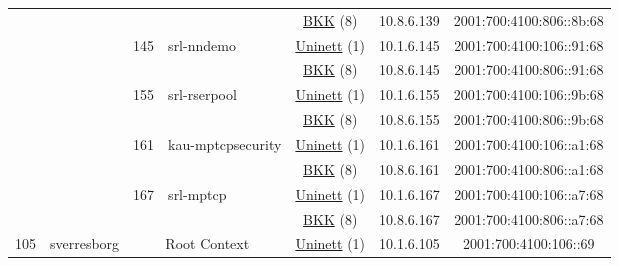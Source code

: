 \begin{small}
\begin{center}
\begin{longtable}{|c|c|c|c|c|c|c|c|}
  &  &  &  & \multicolumn{2}{|c|}{\tiny{\href{http://bkk.no}{BKK} (8)}} & \tiny{10.8.6.139} & \tiny{2001:700:4100:806::8b:68} \\* \cline{3-3}\cline{4-4}\cline{5-5}\cline{6-6}\cline{7-7}\cline{8-8}
  &  & \multirow{2}{*}{\tiny{145}} & \multicolumn{1}{|l|}{\multirow{2}{*}{\tiny{srl-nndemo}}} & \multicolumn{2}{|c|}{\tiny{\href{https://www.uninett.no}{Uninett} (1)}} & \tiny{10.1.6.145} & \tiny{2001:700:4100:106::91:68} \\* \cline{5-5}\cline{6-6}\cline{7-7}\cline{8-8}
  &  &  &  & \multicolumn{2}{|c|}{\tiny{\href{http://bkk.no}{BKK} (8)}} & \tiny{10.8.6.145} & \tiny{2001:700:4100:806::91:68} \\* \cline{3-3}\cline{4-4}\cline{5-5}\cline{6-6}\cline{7-7}\cline{8-8}
  &  & \multirow{2}{*}{\tiny{155}} & \multicolumn{1}{|l|}{\multirow{2}{*}{\tiny{srl-rserpool}}} & \multicolumn{2}{|c|}{\tiny{\href{https://www.uninett.no}{Uninett} (1)}} & \tiny{10.1.6.155} & \tiny{2001:700:4100:106::9b:68} \\* \cline{5-5}\cline{6-6}\cline{7-7}\cline{8-8}
  &  &  &  & \multicolumn{2}{|c|}{\tiny{\href{http://bkk.no}{BKK} (8)}} & \tiny{10.8.6.155} & \tiny{2001:700:4100:806::9b:68} \\* \cline{3-3}\cline{4-4}\cline{5-5}\cline{6-6}\cline{7-7}\cline{8-8}
  &  & \multirow{2}{*}{\tiny{161}} & \multicolumn{1}{|l|}{\multirow{2}{*}{\tiny{kau-mptcpsecurity}}} & \multicolumn{2}{|c|}{\tiny{\href{https://www.uninett.no}{Uninett} (1)}} & \tiny{10.1.6.161} & \tiny{2001:700:4100:106::a1:68} \\* \cline{5-5}\cline{6-6}\cline{7-7}\cline{8-8}
  &  &  &  & \multicolumn{2}{|c|}{\tiny{\href{http://bkk.no}{BKK} (8)}} & \tiny{10.8.6.161} & \tiny{2001:700:4100:806::a1:68} \\* \cline{3-3}\cline{4-4}\cline{5-5}\cline{6-6}\cline{7-7}\cline{8-8}
  &  & \multirow{2}{*}{\tiny{167}} & \multicolumn{1}{|l|}{\multirow{2}{*}{\tiny{srl-mptcp}}} & \multicolumn{2}{|c|}{\tiny{\href{https://www.uninett.no}{Uninett} (1)}} & \tiny{10.1.6.167} & \tiny{2001:700:4100:106::a7:68} \\* \cline{5-5}\cline{6-6}\cline{7-7}\cline{8-8}
  &  &  &  & \multicolumn{2}{|c|}{\tiny{\href{http://bkk.no}{BKK} (8)}} & \tiny{10.8.6.167} & \tiny{2001:700:4100:806::a7:68} \\ \hline
 \multirow{22}{*}{\tiny{105}} & \multicolumn{1}{|l|}{\multirow{22}{*}{\tiny{sverresborg}}} & \multicolumn{2}{|c|}{\multirow{2}{*}{\tiny{Root Context}}} & \multicolumn{2}{|c|}{\tiny{\href{https://www.uninett.no}{Uninett} (1)}} & \tiny{10.1.6.105} & \tiny{2001:700:4100:106::69} \\* \cline{5-5}\cline{6-6}\cline{7-7}\cline{8-8}

\end{longtable}
\end{center}
\end{small}
